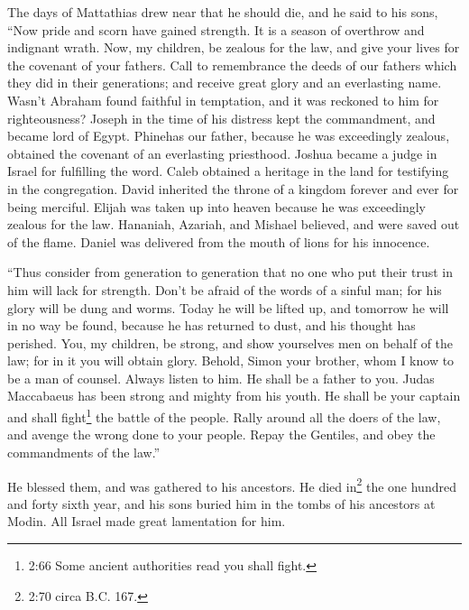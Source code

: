  The days of Mattathias drew near that he should die, and
he said to his sons, ``Now pride and scorn have gained strength. It is a
season of overthrow and indignant wrath.  Now, my children,
be zealous for the law, and give your lives for the covenant of your
fathers.  Call to remembrance the deeds of our fathers
which they did in their generations; and receive great glory and an
everlasting name.  Wasn't Abraham found faithful in
temptation, and it was reckoned to him for righteousness? 
Joseph in the time of his distress kept the commandment, and became lord
of Egypt.  Phinehas our father, because he was exceedingly
zealous, obtained the covenant of an everlasting priesthood.
 Joshua became a judge in Israel for fulfilling the word.
 Caleb obtained a heritage in the land for testifying in
the congregation.  David inherited the throne of a kingdom
forever and ever for being merciful.  Elijah was taken up
into heaven because he was exceedingly zealous for the law.
 Hananiah, Azariah, and Mishael believed, and were saved
out of the flame.  Daniel was delivered from the mouth of
lions for his innocence.

 ``Thus consider from generation to generation that no one
who put their trust in him will lack for strength.  Don't
be afraid of the words of a sinful man; for his glory will be dung and
worms.  Today he will be lifted up, and tomorrow he will in
no way be found, because he has returned to dust, and his thought has
perished.  You, my children, be strong, and show yourselves
men on behalf of the law; for in it you will obtain glory. 
Behold, Simon your brother, whom I know to be a man of counsel. Always
listen to him. He shall be a father to you.  Judas
Maccabaeus has been strong and mighty from his youth. He shall be your
captain and shall fight\footnote{2:66 Some ancient authorities read you
  shall fight.} the battle of the people.  Rally around all
the doers of the law, and avenge the wrong done to your people.
 Repay the Gentiles, and obey the commandments of the
law.''

 He blessed them, and was gathered to his ancestors.
 He died in\footnote{2:70 circa B.C. 167.} the one hundred
and forty sixth year, and his sons buried him in the tombs of his
ancestors at Modin. All Israel made great lamentation for him.

